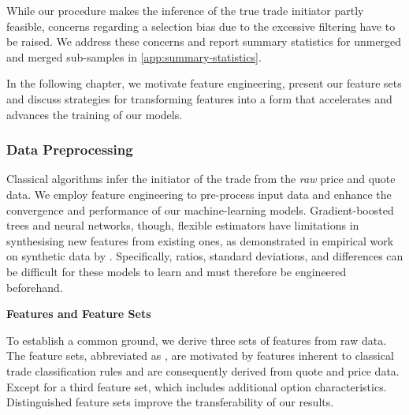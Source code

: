 While our procedure makes the inference of the true trade initiator partly feasible, concerns regarding a selection bias due to the excessive filtering have to be raised. We address these concerns and report summary statistics for unmerged and merged sub-samples in \cref{app:summary-statistics}.

In the following chapter, we motivate feature engineering, present our feature sets and discuss strategies for transforming features into a form that accelerates and advances the training of our models.

\subsubsection{Data Preprocessing}\label{sec:data-preprocessing}

Classical algorithms infer the initiator of the trade from the \emph{raw} price and quote data. We employ feature engineering to pre-process input data and enhance the convergence and performance of our machine-learning models. Gradient-boosted trees and neural networks, though, flexible estimators have limitations in synthesising new features from existing ones, as demonstrated in empirical work on synthetic data by \textcite[][5--6]{heatonEmpiricalAnalysisFeature2016}. Specifically, ratios, standard deviations, and differences can be difficult for these models to learn and must therefore be engineered beforehand.

\textbf{Features and Feature Sets}

To establish a common ground, we derive three sets of features from raw data. The feature sets, abbreviated as , are motivated by features inherent to classical trade classification rules and are consequently derived from quote and price data. Except for a third feature set, which includes additional option characteristics. Distinguished feature sets improve the transferability of our results.

